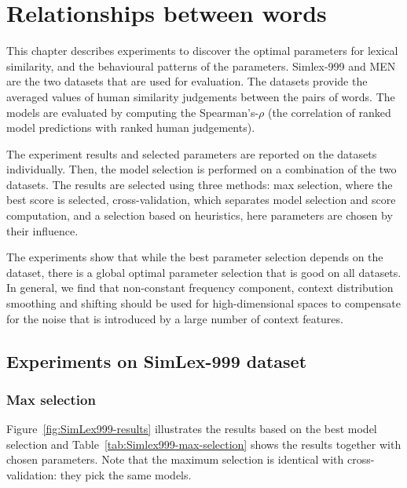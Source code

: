 \chapter{Relationships between words}
\label{sec:lexical}

This chapter describes experiments to discover the optimal parameters for lexical similarity, and the behavioural patterns of the parameters.\footnotemark{}
 Simlex-999 \cite{hill2014simlex} and MEN \cite{Bruni:2014:MDS:2655713.2655714} are the two datasets that are used for evaluation. The datasets provide the averaged values of human similarity judgements between the pairs of words. The models are evaluated by computing the Spearman's-$\rho$ (the correlation of ranked model predictions with ranked human judgements).\footnotemark{}

The experiment results and selected parameters are reported on the datasets individually. Then, the model selection is performed on a combination of the two datasets. The results are selected using three methods: max selection, where the best score is selected, cross-validation, which separates model selection and score computation, and a selection based on heuristics, here parameters are chosen by their influence.

The experiments show that while the best parameter selection depends on the dataset, there is a global optimal parameter selection that is good on all datasets. In general, we find that non-constant frequency component, context distribution smoothing and shifting should be used for high-dimensional spaces to compensate for the noise that is introduced by a large number of context features.

\section{Experiments on SimLex-999 dataset}
\label{sec:simlex-999}

\subsection{Max selection}
\label{sec:max-selection-simlex}



Figure~\ref{fig:SimLex999-results} illustrates the results based on the best model selection and Table~\ref{tab:Simlex999-max-selection} shows the results together with chosen parameters. Note that the maximum selection is identical with cross-validation: they pick the same models.

